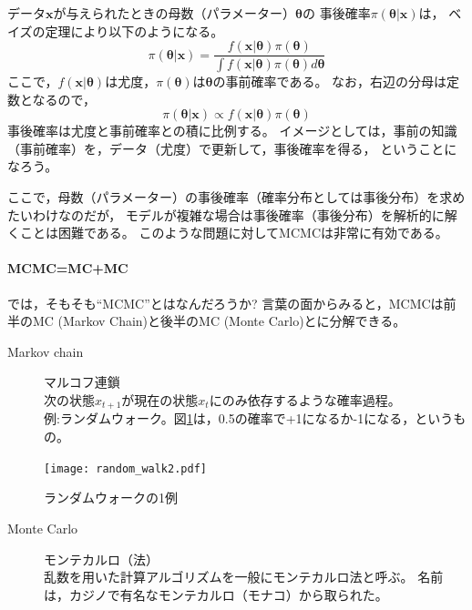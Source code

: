 \documentclass[11pt,uplatex]{jsarticle}
\begin{document}
データ$\bm{x}$が与えられたときの母数（パラメーター）$\bm{\theta}$の
事後確率$\pi(\bm{\theta}|\bm{x})$は，
ベイズの定理により以下のようになる。
\begin{equation}
\pi(\bm{\theta}|\bm{x}) = \frac{f(\bm{x}|\bm{\theta})\pi(\bm{\theta})}
{\int{f(\bm{x}|\bm{\theta})\pi(\bm{\theta})d\bm{\theta}}}\label{bayes1}
\end{equation}
ここで，$f(\bm{x}|\bm{\theta})$は尤度，$\pi(\bm{\theta})$は$\bm{\theta}$の事前確率である。
なお，右辺の分母は定数となるので，
\begin{equation}
\pi(\bm{\theta}|\bm{x}) \propto f(\bm{x}|\bm{\theta})\pi(\bm{\theta})\label{bayes2}
\end{equation}
事後確率は尤度と事前確率との積に比例する。
イメージとしては，事前の知識（事前確率）を，データ（尤度）で更新して，事後確率を得る，
ということになろう。

ここで，母数（パラメーター）の事後確率（確率分布としては事後分布）を求めたいわけなのだが，
モデルが複雑な場合は事後確率（事後分布）を解析的に解くことは困難である。
このような問題に対してMCMCは非常に有効である。

\paragraph{MCMC=MC+MC}

では，そもそも``MCMC''とはなんだろうか?
言葉の面からみると，MCMCは前半のMC (Markov Chain)と後半のMC (Monte Carlo)とに分解できる。

\begin{description}
\item[Markov chain] マルコフ連鎖\\
次の状態$x_{t+1}$が現在の状態$x_{t}$にのみ依存するような確率過程。\\
例:ランダムウォーク。図\ref{random_walk_plot}は，0.5の確率で+1になるか-1になる，というもの。
\end{description}

\begin{figure}[hbtp]
  \begin{center}
    \texttt{[image: random\_walk2.pdf]}
  \end{center}
  \caption{ランダムウォークの1例}
  \label{random_walk_plot}
\end{figure}

\begin{description}
\item[Monte Carlo] モンテカルロ（法）\\
乱数を用いた計算アルゴリズムを一般にモンテカルロ法と呼ぶ。
名前は，カジノで有名なモンテカルロ（モナコ）から取られた。
\end{description}
\end{document}
